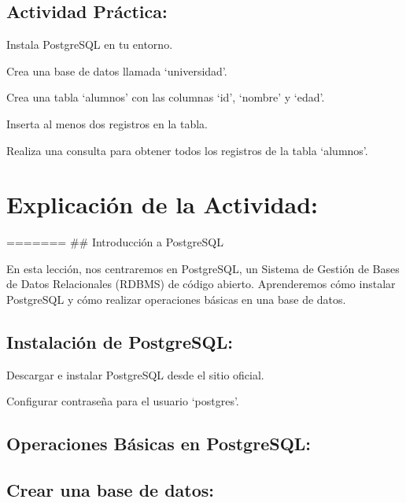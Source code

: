 \documentclass[
  a4paper,
  DIV=11,
  numbers=noendperiod,
  onepage,
  openany]{scrreprt}
\begin{document}
\hypertarget{actividad-pruxe1ctica-60}{%
\subsection{Actividad Práctica:}\label{actividad-pruxe1ctica-60}}

Instala PostgreSQL en tu entorno.

Crea una base de datos llamada `universidad'.

Crea una tabla `alumnos' con las columnas `id', `nombre' y `edad'.

Inserta al menos dos registros en la tabla.

Realiza una consulta para obtener todos los registros de la tabla
`alumnos'.

\hypertarget{explicaciuxf3n-de-la-actividad-66}{%
\section{Explicación de la
Actividad:}\label{explicaciuxf3n-de-la-actividad-66}}

======= \#\# Introducción a PostgreSQL

En esta lección, nos centraremos en PostgreSQL, un Sistema de Gestión de
Bases de Datos Relacionales (RDBMS) de código abierto. Aprenderemos cómo
instalar PostgreSQL y cómo realizar operaciones básicas en una base de
datos.

\hypertarget{instalaciuxf3n-de-postgresql-1}{%
\subsection{Instalación de
PostgreSQL:}\label{instalaciuxf3n-de-postgresql-1}}

Descargar e instalar PostgreSQL desde el sitio oficial.

Configurar contraseña para el usuario `postgres'.

\hypertarget{operaciones-buxe1sicas-en-postgresql-1}{%
\subsection{Operaciones Básicas en
PostgreSQL:}\label{operaciones-buxe1sicas-en-postgresql-1}}

\hypertarget{crear-una-base-de-datos-1}{%
\subsection{Crear una base de datos:}\label{crear-una-base-de-datos-1}}
\end{document}
